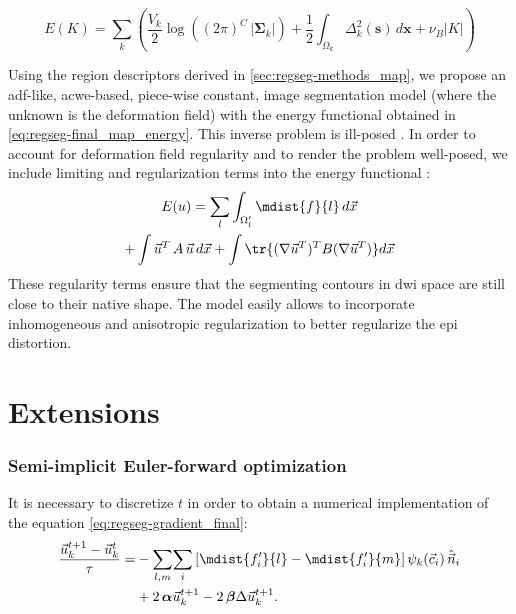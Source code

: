 \begin{equation}
E(K) = \sum\limits_k \left( \frac{ V_k }{2} \log{ \left( (2\pi)^{C}\,\left|\boldsymbol{\Sigma}_{k}\right| \right)}+ \frac{1}{2} \int_{\Omega_k} \Delta^2_k (\mathbf{s}) \,d\mathbf{x}+\nu_B \left|K\right| \right)
\end{equation}

{\color{red} {Using the region descriptors derived in \autoref{sec:regseg-methods_map}, we propose
an \gls{adf}-like, \gls{acwe}-based, piece-wise constant, image segmentation
model (where the unknown is the deformation field)
\cite{chan_active_2001} with the energy functional obtained in
\eqref{eq:regseg-final_map_energy}. This inverse problem is ill-posed
\cite{bertero_illposed_1988,hadamard_sur_1902}.
In order to account for deformation field regularity and to render the
problem well-posed, we include limiting and regularization terms into
the energy functional \cite{morozov_linear_1975,tichonov_solution_1963}:
%
\begin{multline}
E(u) = \sum\limits_l \int_{\Omega'_l} \mdist{f}{l} \,d\vec{x} \\
+ \int \vec{u}^T \, A \, \vec{u} \, d\vec{x} + \int \tr\{(\nabla \vec{u}^T)^T B (\nabla \vec{u}^T)\} d\vec{x}
\label{eq:regseg-complete_energy}
\end{multline}
%
These regularity terms ensure that the segmenting contours in
\gls{dwi} space are still close to their native shape. The model
easily allows to incorporate inhomogeneous and anisotropic
regularization \cite{nagel_investigation_1986} to better regularize
the \gls{epi} distortion.}}


\section{Extensions}

\subsubsection{Semi-implicit Euler-forward optimization}
It is necessary to discretize $t$ in order to obtain a numerical
implementation of the equation \eqref{eq:regseg-gradient_final}:
\begin{align}
\frac{\vec{u}_k^{t+1}-\vec{u}_k^t}{\tau} =
&- \underset{l,m}{\sum} \underset{i}{\sum}
\left[ \mdist{f_i'}{l} - \mdist{f_i'}{m}\right]
\psi_k(\vec{c}_i)\, \hat{\vec{n}}_i \notag\\
&+2\, \boldsymbol{\alpha} \vec{u}_k^{t+1}
-2\, \boldsymbol{\beta} \Delta \vec{u}_k^{t+1}.
\end{align}


